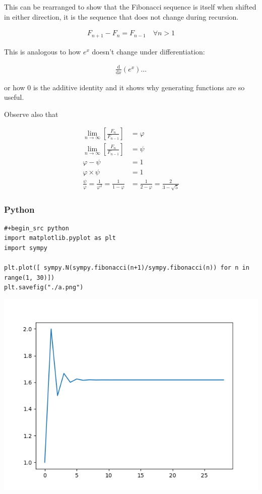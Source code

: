 \documentclass[11pt]{article}
\begin{document}
This can be rearranged to show that the Fibonacci sequence is itself
when shifted in either direction, it is the sequence that does not
change during recursion.

\[\begin{aligned}
F_{n+ 1} - F_{n} = F_{n- 1} \quad \forall n > 1
\end{aligned}\]

This is analogous to how \(e^x\) doesn't change under differentiation:

$$\begin{aligned}
\frac{\mathrm{d} }{\mathrm{d} x}\left( e^x \right) \ldots
\end{aligned}$$

or how 0 is the additive identity and it shows why generating functions
are so useful.

Observe also that

$$\begin{aligned}
\lim_{n     \rightarrow \infty }\left[ \frac{F_n}{F_{n- 1} }  \right] &= \varphi \\
\lim_{n     \rightarrow \infty }\left[ \frac{F_n}{F_{n- 1} }  \right] &= \psi \\
\varphi - \psi &=  1 \\
\varphi \times  \psi  &= 1 \\
\frac{\psi}{\varphi}  = \frac{1}{\varphi^2} = \frac{1}{1-\varphi} &= \frac{1}{2-\varphi} = \frac{2}{3 - \sqrt{5}  }
\end{aligned}$$
\subsubsection{Python}
\label{sec:orge4a6275}

\begin{verbatim}
#+begin_src python
import matplotlib.pyplot as plt
import sympy

plt.plot([ sympy.N(sympy.fibonacci(n+1)/sympy.fibonacci(n)) for n in range(1, 30)])
plt.savefig("./a.png")
\end{verbatim}
\begin{center}
\includegraphics[width=.9\linewidth]{./a.png}
\end{center}
\end{document}
